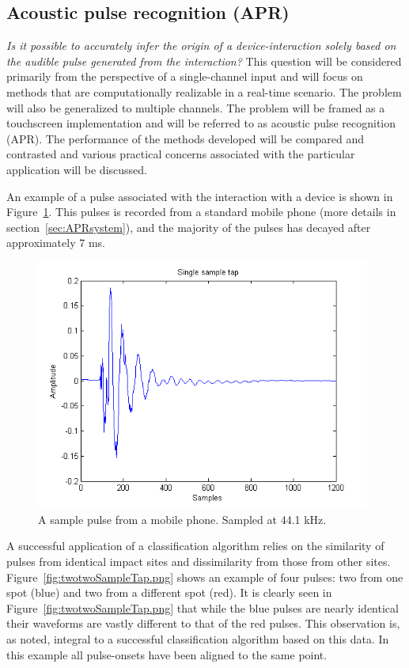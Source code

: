 \subsection{Acoustic pulse recognition (APR)}
\emph{Is it possible to accurately infer the origin of a device-interaction solely based on the audible pulse generated from the interaction?}
This question will be considered primarily from the perspective of a single-channel input and will focus on methods that are computationally realizable in a real-time scenario. The problem will also be generalized to multiple channels. The problem will be framed as a touchscreen implementation and will be referred to as acoustic pulse recognition (APR). The performance of the methods developed will be compared and contrasted and various practical concerns associated with the particular application will be discussed.

An example of a pulse associated with the interaction with a device is shown in Figure~\ref{fig:singleSampleTap.png}. This pulses is recorded from a standard mobile phone (more details in section~\ref{sec:APRsystem}), and the majority of the pulses has decayed after approximately 7 ms.

\begin{figure}
  \begin{center}
    \includegraphics[width=110mm]{singleSampleTap.png}
    \caption{A sample pulse from a mobile phone. Sampled at 44.1 kHz.}\label{fig:singleSampleTap.png}
  \end{center}
\end{figure}

A successful application of a classification algorithm relies on the similarity of pulses from identical impact sites and dissimilarity from those from other sites. Figure~\ref{fig:twotwoSampleTap.png} shows an example of four pulses: two from one spot (blue) and two from a different spot (red). It is clearly seen in Figure~\ref{fig:twotwoSampleTap.png} that while the blue pulses are nearly identical their waveforms are vastly different to that of the red pulses. This observation is, as noted, integral to a successful classification algorithm based on this data. In this example all pulse-onsets have been aligned to the same point.

